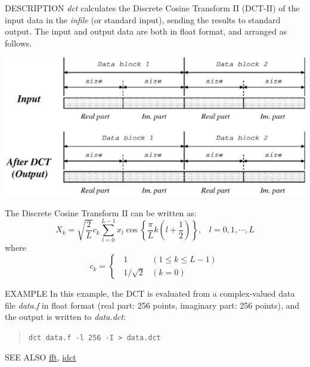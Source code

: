 \begin{synopsis}
\item[dct] [ --l $L$ ] [ --I ] [ --d ] [ {\em infile} ]
\end{synopsis}

\begin{qsection}{DESCRIPTION}
{\em dct} calculates the Discrete Cosine Transform II (DCT-II)
of the input data in the {\em infile} (or standard input),
sending the results to standard output.
The input and output data are both in float format, and arranged as follows.
\begin{center}
 \leavevmode
 \includegraphics{fig/dct.eps}
\end{center}
The Discrete Cosine Transform II can be written as:
\begin{displaymath}
 X_{k} =  \sqrt{\frac{2}{L}}c_{k}\sum_{l=0}^{L-1}
x_{l}\cos\left\{\frac{\pi}{L} k \left( l + \frac{1}{2} \right) \right\},
\;\;\; l = 0, 1, \cdots, L
\end{displaymath}
 where
 \begin{displaymath}
  c_{k}= \begin{cases}
         \;\;1 & ( 1 \le k \le L - 1 ) \\
         \;\; 1 / \sqrt{2} & (k = 0)
         \end{cases}
 \end{displaymath}
\par
\end{qsection}

\begin{options}
\end{options}

\begin{qsection}{EXAMPLE}
In this example, the DCT is evaluated from a complex-valued data file
{\em data.f} in float format
(real part: 256 points, imaginary part: 256 points),
and the output is written to {\em data.dct}:
\begin{quote}
  \verb!dct data.f -l 256 -I > data.dct!
\end{quote}
\end{qsection}

\begin{qsection}{SEE ALSO}
\hyperlink{fft}{fft},
\hyperlink{idct}{idct}
\end{qsection}
